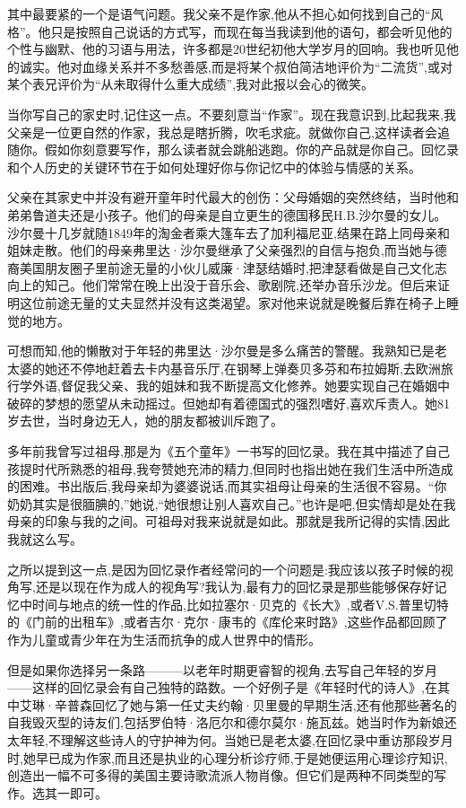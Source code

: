 其中最要紧的一个是语气问题。我父亲不是作家,他从不担心如何找到自己的“风格”。他只是按照自己说话的方式写，而现在每当我读到他的语句，都会听见他的个性与幽默、他的习语与用法，许多都是20世纪初他大学岁月的回响。我也听见他的诚实。他对血缘关系并不多愁善感,而是将某个叔伯简洁地评价为“二流货”,或对某个表兄评价为“从未取得什么重大成绩”,我对此报以会心的微笑。

当你写自己的家史时,记住这一点。不要刻意当“作家”。现在我意识到,比起我来,我父亲是一位更自然的作家，我总是瞎折腾，吹毛求疵。就做你自己,这样读者会追随你。假如你刻意要写作，那么读者就会跳船逃跑。你的产品就是你自己。回忆录和个人历史的关键环节在于如何处理好你与你记忆中的体验与情感的关系。


父亲在其家史中并没有避开童年时代最大的创伤：父母婚姻的突然终结，当时他和弟弟鲁道夫还是小孩子。他们的母亲是自立更生的德国移民H.B.沙尔曼的女儿。沙尔曼十几岁就随1849年的淘金者乘大篷车去了加利福尼亚,结果在路上同母亲和姐妹走散。他们的母亲弗里达·沙尔曼继承了父亲强烈的自信与抱负,而当她与德裔美国朋友圈子里前途无量的小伙儿威廉·津瑟结婚时,把津瑟看做是自己文化志向上的知己。他们常常在晚上出没于音乐会、歌剧院,还举办音乐沙龙。但后来证明这位前途无量的丈夫显然并没有这类渴望。家对他来说就是晚餐后靠在椅子上睡觉的地方。

可想而知,他的懒散对于年轻的弗里达·沙尔曼是多么痛苦的警醒。我熟知已是老太婆的她还不停地赶着去卡内基音乐厅,在钢琴上弹奏贝多芬和布拉姆斯,去欧洲旅行学外语,督促我父亲、我的姐妹和我不断提高文化修养。她要实现自己在婚姻中破碎的梦想的愿望从未动摇过。但她却有着德国式的强烈嗜好,喜欢斥责人。她81岁去世，当时身边无人，她的朋友都被训斥跑了。

多年前我曾写过祖母,那是为《五个童年》一书写的回忆录。我在其中描述了自己孩提时代所熟悉的祖母,我夸赞她充沛的精力,但同时也指出她在我们生活中所造成的困难。书出版后,我母亲却为婆婆说话,而其实祖母让母亲的生活很不容易。“你奶奶其实是很腼腆的,”她说,“她很想让别人喜欢自己。”也许是吧,但实情却是处在我母亲的印象与我的之间。可祖母对我来说就是如此。那就是我所记得的实情,因此我就这么写。

之所以提到这一点,是因为回忆录作者经常问的一个问题是:我应该以孩子时候的视角写,还是以现在作为成人的视角写?我认为,最有力的回忆录是那些能够保存好记忆中时间与地点的统一性的作品,比如拉塞尔·贝克的《长大》,或者V.S.普里切特的《门前的出租车》,或者吉尔·克尔·康韦的《库伦来时路》,这些作品都回顾了作为儿童或青少年在为生活而抗争的成人世界中的情形。

但是如果你选择另一条路———以老年时期更睿智的视角,去写自己年轻的岁月——这样的回忆录会有自己独特的路数。一个好例子是《年轻时代的诗人》,在其中艾琳·辛普森回忆了她与第一任丈夫约翰·贝里曼的早期生活,还有他那些著名的自我毁灭型的诗友们,包括罗伯特·洛厄尔和德尔莫尔·施瓦兹。她当时作为新娘还太年轻,不理解这些诗人的守护神为何。当她已是老太婆,在回忆录中重访那段岁月时,她早已成为作家,而且还是执业的心理分析诊疗师,于是她便运用心理诊疗知识,创造出一幅不可多得的美国主要诗歌流派人物肖像。但它们是两种不同类型的写作。选其一即可。

